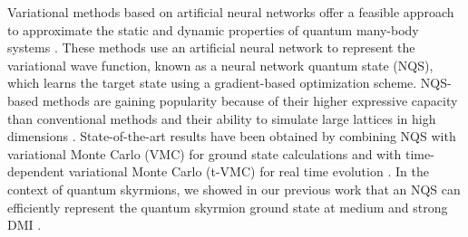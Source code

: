 \documentclass[aps,prb,twocolumn,superscriptaddress,a4paper,longbibliography]{revtex4-2}
\begin{document}
Variational methods based on artificial neural networks offer a feasible approach to approximate the static and dynamic properties of quantum many-body systems \cite{carleo_solving_2017,nomura_restricted-boltzmann-machine_2017,choo_symmetries_2018,saito_machine_2018,szabo_neural_2020,hibat-allah_recurrent_2020,kochkov_learning_2021,inui_determinant-free_2021,viteritti_transformer_2023,donatella_dynamics_2023,sinibaldi_unbiasing_2023}. These methods use an artificial neural network to represent the variational wave function, known as a neural network quantum state (NQS), which learns the target state using a gradient-based optimization scheme. NQS-based methods are gaining popularity because of their higher expressive capacity than conventional methods and their ability to simulate large lattices in high dimensions \cite{sharir_neural_2022,sharir_towards_2022,moreno_fermionic_2022}. State-of-the-art results have been obtained by combining NQS with variational Monte Carlo (VMC) for ground state calculations \cite{roth_high-accuracy_2023,rende_simple_2023} and with time-dependent variational Monte Carlo (t-VMC) for real time evolution \cite{schmitt_quantum_2020,mendes-santos_highly_2023}. In the context of quantum skyrmions, we showed in our previous work that an NQS can efficiently represent the quantum skyrmion ground state at medium and strong DMI \cite{joshi_ground_2023}.
\end{document}
